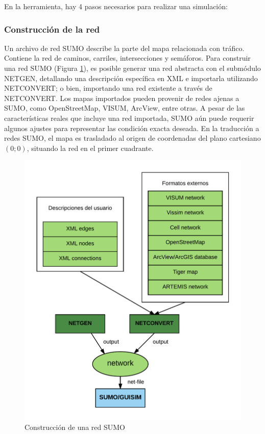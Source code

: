 En la herramienta, hay 4 pasos necesarios para realizar una simulación:

\subsubsection*{Construcción de la red}
    Un archivo de red SUMO describe la parte del mapa relacionada con tráfico. Contiene la red de caminos, carriles, intersecciones y semáforos. Para construir una red SUMO (Figura \ref{fig:sumonet}), es posible generar una red abstracta con el submódulo NETGEN, detallando una descripción específica en XML e importarla utilizando NETCONVERT; o bien, importando una red existente a través de NETCONVERT. Los mapas importados pueden provenir de redes ajenas a SUMO, como OpenStreetMap, VISUM, ArcView, entre otras. A pesar de las características reales que incluye una red importada, SUMO aún puede requerir algunos ajustes para representar las condición exacta deseada. En la traducción a redes SUMO, el mapa es trasladado al origen de coordenadas del plano cartesiano $(0;0)$, situando la red en el primer cuadrante.
    \begin{figure}[!htp]
    	\centering
    	\includegraphics[scale=0.6]{images/sumo-buildnet.png}
    	\caption{Construcción de una red SUMO}
        \label{fig:sumonet}
    \end{figure}

